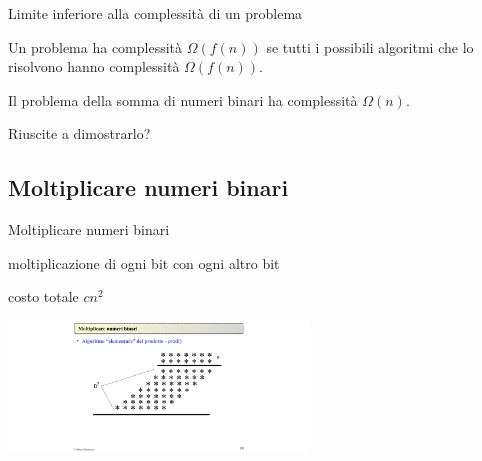 \begin{frame}{Limite inferiore alla complessità di un problema}

\vspace{-9pt}
\begin{myboxtitle}
Un problema ha complessità $\Omega(f(n))$ se tutti i possibili algoritmi che lo risolvono hanno complessità $\Omega(f(n))$.
\end{myboxtitle}

\bigskip
\begin{myboxtitle}
Il problema della somma di numeri binari ha complessità $\Omega(n)$.
\end{myboxtitle}

\begin{myboxtitle}[Domanda]
Riuscite a dimostrarlo?
\end{myboxtitle}

\end{frame}

\subsection{Moltiplicare numeri binari}

\begin{frame}{Moltiplicare numeri binari}

\vspace{-9pt}
\begin{myboxtitle}
\BI
\item moltiplicazione di ogni bit con ogni altro bit
\item costo totale $cn^2$
\EI
\end{myboxtitle}

\medskip
\begin{center}
\includegraphics[width=8cm]{mul.pdf}
\end{center}

\end{frame}

